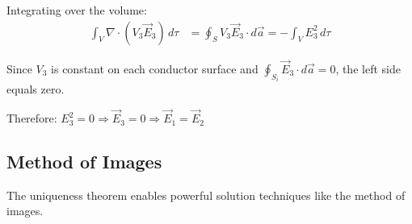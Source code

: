 \documentclass{article}
\begin{document}
Integrating over the volume:
\begin{align*}
    \int_V \nabla \cdot (V_3 \vec{E}_3) \, d\tau &= \oint_S V_3 \vec{E}_3 \cdot d\vec{a} = -\int_V E_3^2 \, d\tau
\end{align*}

Since $V_3$ is constant on each conductor surface and $\oint_{S_i} \vec{E}_3 \cdot d\vec{a} = 0$, the left side equals zero.

Therefore: $E_3^2 = 0 \Rightarrow \vec{E}_3 = 0 \Rightarrow \vec{E}_1 = \vec{E}_2$

\subsection{Method of Images}

The uniqueness theorem enables powerful solution techniques like the method of images.
\end{document}
